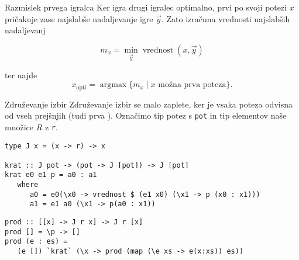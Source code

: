 \documentclass{beamer}
\newcommand{\argmax}{\operatorname{argmax}}
\begin{document}
\begin{frame}{Razmislek prvega igralca}
Ker igra drugi igralec optimalno, prvi po svoji potezi $x$ pričakuje zase najslabše nadaljevanje igre $\vec{y}$. Zato izračuna vrednosti najslabših nadaljevanj

$$m_x =\min_{\vec{y}} \operatorname{vrednost}(x, \vec{y})$$

ter najde $$x_{\text{opti}} = \argmax \{m_x\mid x \text{ možna prva poteza} \}\text{.}$$



\end{frame}

\begin{frame}[fragile]{Združevanje izbir}%
Združevanje izbir se malo zaplete, ker je vsaka poteza odvisna od vseh prejšnjih (tudi prva \smiley).
Označimo tip potez s \texttt{pot} in tip elementov naše množice $R$ z \texttt{r}.
\pause
\begin{lstlisting}
type J x = (x -> r) -> x

krat :: J pot -> (pot -> J [pot]) -> J [pot]
krat e0 e1 p = a0 : a1
   where
      a0 = e0(\x0 -> vrednost $ (e1 x0) (\x1 -> p (x0 : x1)))
      a1 = e1 a0 (\x1 -> p(a0 : x1))
\end{lstlisting}
\pause
\begin{lstlisting}
prod :: [[x] -> J r x] -> J r [x]
prod [] = \p -> []
prod (e : es) =  
   (e []) `krat` (\x -> prod (map (\e xs -> e(x:xs)) es))
\end{lstlisting}
\end{frame}
\end{document}
